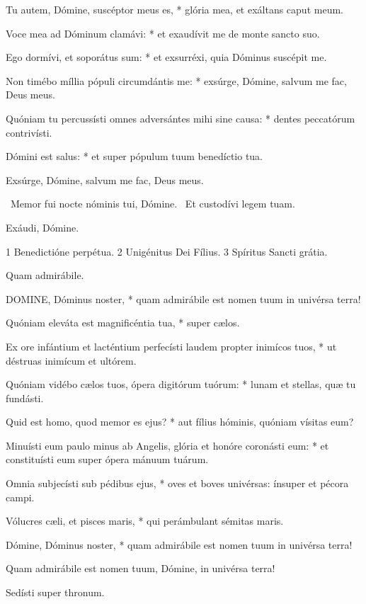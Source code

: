 Tu autem, Dómine, suscéptor meus es, * glória mea, et exáltans caput meum.

Voce mea ad Dóminum clamávi: * et exaudívit me de monte sancto suo.

Ego dormívi, et soporátus sum: * et exsurréxi, quia Dóminus suscépit me.

Non timébo míllia pópuli circumdántis me: * exsúrge, Dómine, salvum me fac, Deus meus.

Quóniam tu percussísti omnes adversántes mihi sine causa: * dentes peccatórum contrivísti.

Dómini est salus: * et super pópulum tuum benedíctio tua.

 Exsúrge, Dómine, salvum me fac, Deus meus.

\V\ Memor fui nocte nóminis tui, Dómine. \R\ Et custodívi legem tuam.

 Exáudi, Dómine.

 1 Benedictióne perpétua. 2 Unigénitus Dei Fílius. 3 Spíritus Sancti grátia.


 Quam admirábile.


\lettrine[lines=2]{D}{OMINE}, Dóminus noster, * quam admirábile est nomen tuum in univérsa terra!

Quóniam eleváta est magnificéntia tua, * super cælos.

Ex ore infántium et lacténtium perfecísti laudem propter inimícos tuos, * ut déstruas inimícum et ultórem.

Quóniam vidébo cælos tuos, ópera digitórum tuórum: * lunam et stellas, quæ tu fundásti.

Quid est homo, quod memor es ejus? * aut fílius hóminis, quóniam vísitas eum?

Minuísti eum paulo minus ab Angelis, glória et honóre coronásti eum: * et constituísti eum super ópera mánuum tuárum.

Omnia subjecísti sub pédibus ejus, * oves et boves univérsas: ínsuper et pécora campi.

Vólucres cæli, et pisces maris, * qui perámbulant sémitas maris.

Dómine, Dóminus noster, * quam admirábile est nomen tuum in univérsa terra!

 Quam admirábile est nomen tuum, Dómine, in univérsa terra!

 Sedísti super thronum.

